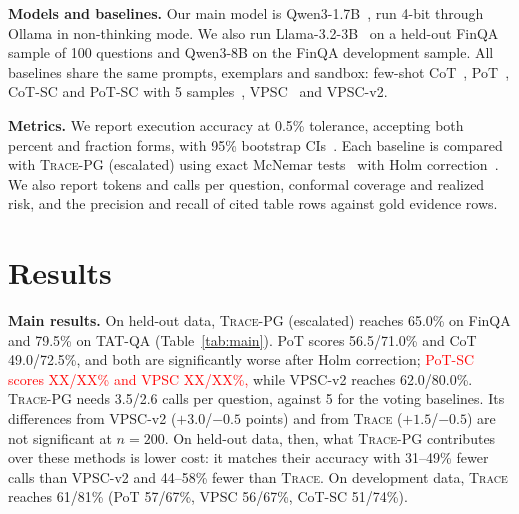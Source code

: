 \documentclass[conference]{IEEEtran}
\newcommand{\ours}{\textsc{Trace-PG}}
\newcommand{\trace}{\textsc{Trace}}
\newcommand{\TBD}[1]{\textcolor{red}{#1}}
\begin{document}
\textbf{Models and baselines.} Our main model is Qwen3-1.7B~\cite{qwen3}, run 4-bit through Ollama in non-thinking mode. We also run Llama-3.2-3B~\cite{llama3} on a held-out FinQA sample of 100 questions and Qwen3-8B on the FinQA development sample. All baselines share the same prompts, exemplars and sandbox: few-shot CoT~\cite{cot}, PoT~\cite{pot}, CoT-SC and PoT-SC with 5 samples~\cite{sc}, VPSC~\cite{vpsc} and VPSC-v2.

\textbf{Metrics.} We report execution accuracy at 0.5\% tolerance, accepting both percent and fraction forms, with 95\% bootstrap CIs~\cite{bootstrap}. Each baseline is compared with \ours{} (escalated) using exact McNemar tests~\cite{mcnemar} with Holm correction~\cite{holm,dror}. We also report tokens and calls per question, conformal coverage and realized risk, and the precision and recall of cited table rows against gold evidence rows.

\section{Results}
\begin{table}[t]
\centering
\caption{Execution accuracy (\%) with 95\% bootstrap CIs, Qwen3-1.7B. H = held-out (never inspected), D = development. $^{\ast}$: \ours{} (escalated) is significantly better (exact McNemar, Holm $p<0.05$). Tokens/calls refer to the first column. \ours{} rows on D are in-sample for the verifier (its 5-fold CV accuracy on development data is 71.0\% vs.\ 70.7\% for \trace{}'s fixed weights).}
\label{tab:main}
\footnotesize

\end{table}

\textbf{Main results.} On held-out data, \ours{} (escalated) reaches 65.0\% on FinQA and 79.5\% on TAT-QA (Table~\ref{tab:main}). PoT scores 56.5/71.0\% and CoT 49.0/72.5\%, and both are significantly worse after Holm correction; \TBD{PoT-SC scores XX/XX\% and VPSC XX/XX\%,} while VPSC-v2 reaches 62.0/80.0\%. \ours{} needs 3.5/2.6 calls per question, against 5 for the voting baselines. Its differences from VPSC-v2 ($+3.0$/$-0.5$ points) and from \trace{} ($+1.5$/$-0.5$) are not significant at $n{=}200$. On held-out data, then, what \ours{} contributes over these methods is lower cost: it matches their accuracy with 31--49\% fewer calls than VPSC-v2 and 44--58\% fewer than \trace{}. On development data, \trace{} reaches 61/81\% (PoT 57/67\%, VPSC 56/67\%, CoT-SC 51/74\%).

\begin{table}[t]
\centering
\caption{Typed verification and template completion: share of programs lifted, base error rate, and for each check the share of flagged programs that are wrong (number flagged); completion: share of questions where it fires and its accuracy then (\%).}
\label{tab:signals}
\footnotesize
\setlength{\tabcolsep}{2pt}

\end{table}
\end{document}
